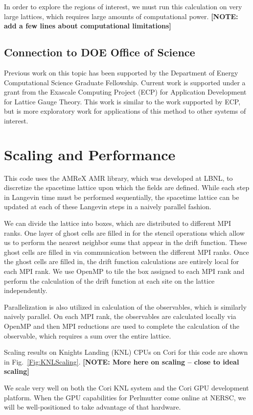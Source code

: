 \documentclass[onecolumn, 12pt]{report}
\newcommand{\note}[1]{{\color{red} \bf[NOTE: #1]}}
\begin{document}
In order to explore the regions of interest, we must run this calculation on very large lattices, which requires large amounts of computational power. \note{add a few lines about computational limitations}

\subsection{Connection to DOE Office of Science}
Previous work on this topic has been supported by the Department of Energy Computational Science Graduate Fellowship. Current work is supported under a grant from the Exascale Computing Project (ECP) for Application Development for Lattice Gauge Theory. This work is similar to the work supported by ECP, but is more exploratory work for applications of this method to other systems of interest.

\section{Scaling and Performance}
This code uses the AMReX AMR library, which was developed at LBNL, to discretize the spacetime lattice upon which the fields are defined. While each step in Langevin time must be performed sequentially, the spacetime lattice can be updated at each of these Langevin steps in a naively parallel fashion. 

We can divide the lattice into boxes, which are distributed to different MPI ranks. One layer of ghost cells are filled in for the stencil operations which allow us to perform the nearest neighbor sums that appear in the drift function. These ghost cells are filled in via communication between the different MPI ranks. Once the ghost cells are filled in, the drift function calculations are entirely local for each MPI rank. We use OpenMP to tile the box assigned to each MPI rank and perform the calculation of the drift function at each site on the lattice independently.

Parallelization is also utilized in calculation of the observables, which is similarly naively parallel. On each MPI rank, the observables are calculated locally via OpenMP and then MPI reductions are used to complete the calculation of the observable, which requires a sum over the entire lattice.


Scaling results on Knights Landing (KNL) CPUs on Cori for this code are shown in Fig.~\ref{Fig:KNLScaling}.  \note{More here on scaling -- close to ideal scaling}

We scale very well on both the Cori KNL system and the Cori GPU development platform. When the GPU capabilities for Perlmutter come online at NERSC, we will be well-positioned to take advantage of that hardware. 
\end{document}
